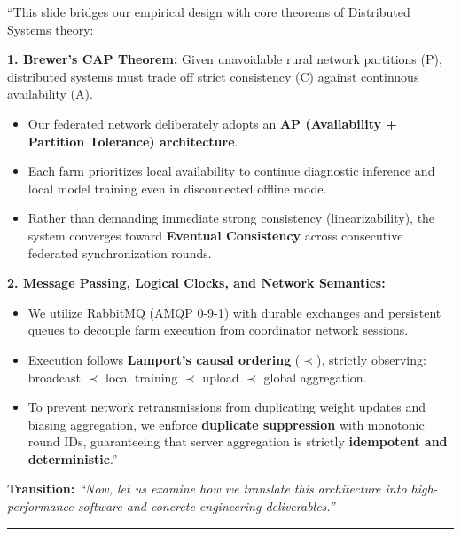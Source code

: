 \documentclass[11pt,a4paper]{article}
\begin{document}
\begin{tcolorbox}[colframe=darkgreen, title=\textbf{What to Say in the Presentation (Literal Script)}]
``This slide bridges our empirical design with core theorems of Distributed Systems theory:

\textbf{1. Brewer's CAP Theorem:}
Given unavoidable rural network partitions (P), distributed systems must trade off strict consistency (C) against continuous availability (A).
\begin{itemize}
    \item Our federated network deliberately adopts an \textbf{AP (Availability + Partition Tolerance) architecture}.
    \item Each farm prioritizes local availability to continue diagnostic inference and local model training even in disconnected offline mode.
    \item Rather than demanding immediate strong consistency (linearizability), the system converges toward \textbf{Eventual Consistency} across consecutive federated synchronization rounds.
\end{itemize}

\textbf{2. Message Passing, Logical Clocks, and Network Semantics:}
\begin{itemize}
    \item We utilize RabbitMQ (AMQP 0-9-1) with durable exchanges and persistent queues to decouple farm execution from coordinator network sessions.
    \item Execution follows \textbf{Lamport's causal ordering} ($\prec$), strictly observing: broadcast $\prec$ local training $\prec$ upload $\prec$ global aggregation.
    \item To prevent network retransmissions from duplicating weight updates and biasing aggregation, we enforce \textbf{duplicate suppression} with monotonic round IDs, guaranteeing that server aggregation is strictly \textbf{idempotent and deterministic}.''
\end{itemize}
\end{tcolorbox}

\textbf{Transition:} \textit{``Now, let us examine how we translate this architecture into high-performance software and concrete engineering deliverables.''}

\vspace{0.35cm}\hrule\vspace{0.35cm}

\end{document}
